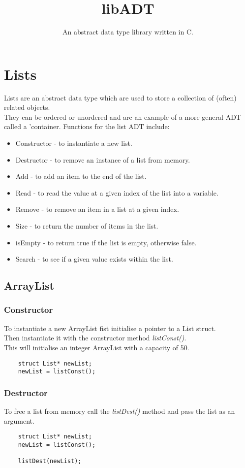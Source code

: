 \documentclass{article}
\title{libADT}
\subtitle{An abstract data type library written in C.}
\author{}
\date{}
\begin{document}
\lstset{language=C}

\maketitle
\newpage{}
\section{Lists}
Lists are an abstract data type which are used to store a collection of (often) related objects.\\
They can be ordered or unordered and are an example of a more general ADT called a 'container.
Functions for the list ADT include:
\begin{itemize}
\item {Constructor} - to instantiate a new list.
\item {Destructor} - to remove an instance of a list from memory.
\item {Add} - to add an item to the end of the list.
\item {Read} - to read the value at a given index of the list into a variable. 
\item {Remove} - to remove an item in a list at a given index.
\item {Size} - to return the number of items in the list.
\item {isEmpty} - to return true if the list is empty, otherwise false.
\item {Search} - to see if a given value exists within the list.
\end{itemize}

\subsection*{ArrayList}
\subsubsection*{Constructor}
To instantiate a new ArrayList fist initialise a pointer to a List struct.\\
Then instantiate it with the constructor method \emph{listConst()}. \\
This will initialise an integer ArrayList with a capacity of 50.
\begin{lstlisting}
    struct List* newList;
    newList = listConst();
\end{lstlisting}

\subsubsection*{Destructor}
To free a list from memory call the \emph{listDest()} method and pass the list as an argument.
\begin{lstlisting}
    struct List* newList;
    newList = listConst();

    listDest(newList);
\end{lstlisting}
\end{document}
